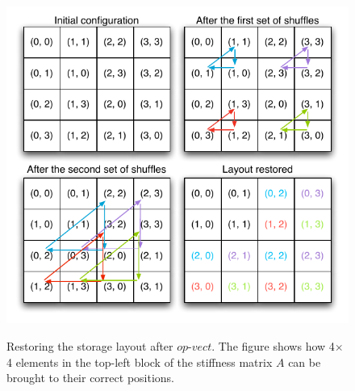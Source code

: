 \documentclass[conference]{IEEEtran}
\begin{document}
\begin{figure}[t]
\centerline{\includegraphics[scale=0.7]{Pictures/vect-restore.pdf}
\label{fig:restore-layout}}
\caption{Restoring the storage layout after $op$-$vect$. The figure shows how 4$\times$4 elements in the top-left block of the stiffness matrix $A$ can be brought to their correct positions.}
\end{figure}

\end{document}
